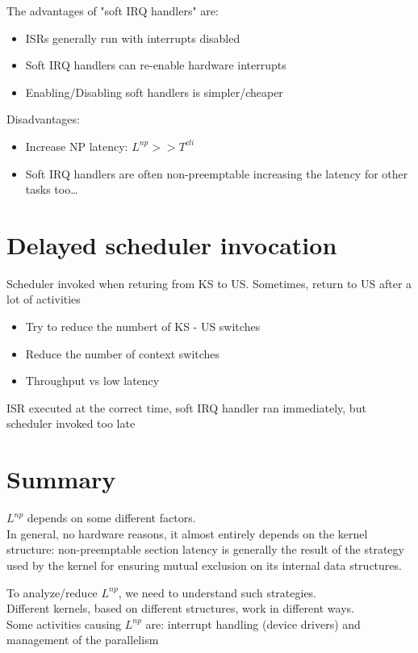 The advantages of "soft IRQ handlers" are:
\begin{itemize}
    \item ISRs generally run with interrupts disabled
    \item Soft IRQ handlers can re-enable hardware interrupts
    \item Enabling/Disabling soft handlers is simpler/cheaper
\end{itemize}
Disadvantages:
\begin{itemize}
    \item Increase NP latency: $L^{np} >> T^{cli}$
    \item Soft IRQ handlers are often non-preemptable increasing the latency for other tasks too\dots
\end{itemize}
\section{Delayed scheduler invocation}
Scheduler invoked when returing from KS to US.
Sometimes, return to US after a lot of activities
\begin{itemize}
    \item Try to reduce the numbert of KS - US switches
    \item Reduce the number of context switches
    \item Throughput vs low latency
\end{itemize}
ISR executed at the correct time, soft IRQ handler ran immediately, but scheduler invoked too late

\section{Summary}
$L^{np}$ depends on some different factors.\\
In general, no hardware reasons, it almost entirely depends on the kernel structure: non-preemptable section latency is generally the result of the strategy used by the kernel for ensuring mutual exclusion on its internal data structures.

To analyze/reduce $L^{np}$, we need to understand such strategies.\\
Different kernels, based on different structures, work in different ways.\\
Some activities causing $L^{np}$ are: interrupt handling (device drivers) and management of the parallelism